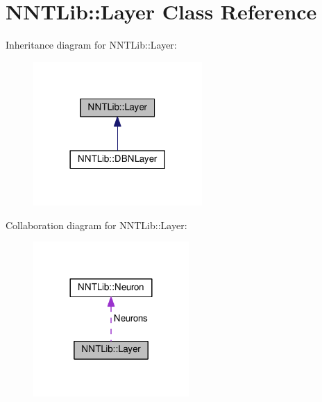 \hypertarget{class_n_n_t_lib_1_1_layer}{}\section{N\+N\+T\+Lib\+:\+:Layer Class Reference}
\label{class_n_n_t_lib_1_1_layer}


Inheritance diagram for N\+N\+T\+Lib\+:\+:Layer\+:\nopagebreak
\begin{figure}[H]
\begin{center}
\leavevmode
\includegraphics[width=182pt]{class_n_n_t_lib_1_1_layer__inherit__graph}
\end{center}
\end{figure}


Collaboration diagram for N\+N\+T\+Lib\+:\+:Layer\+:\nopagebreak
\begin{figure}[H]
\begin{center}
\leavevmode
\includegraphics[width=168pt]{class_n_n_t_lib_1_1_layer__coll__graph}
\end{center}
\end{figure}
